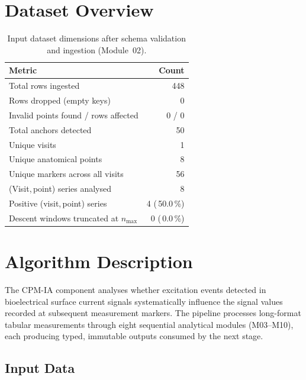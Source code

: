 \documentclass[a4paper,11pt]{article}
\begin{document}
\section{Dataset Overview}

\begin{table}[h!]
\centering
\small
\caption{Input dataset dimensions after schema validation and ingestion (Module~02).}
\begin{tabular}{lr}
\toprule
\textbf{Metric} & \textbf{Count} \\
\midrule
Total rows ingested                        & 448 \\
Rows dropped (empty keys)                  & 0 \\
Invalid points found / rows affected       & 0 / 0 \\
Total anchors detected                     & 50 \\
Unique visits                          & 1 \\
Unique anatomical points               & 8 \\
Unique markers across all visits       & 56 \\
(Visit,\,point) series analysed        & 8 \\
Positive (visit,\,point) series        & 4 (\,50.0\,\%) \\
Descent windows truncated at $n_{\max}$ & 0 (\,0.0\,\%) \\
\bottomrule
\end{tabular}
\end{table}

\section{Algorithm Description}

The CPM-IA component analyses whether excitation events detected in bioelectrical surface
current signals systematically influence the signal values recorded at subsequent measurement
markers. The pipeline processes long-format tabular measurements through eight sequential
analytical modules (M03--M10), each producing typed, immutable outputs consumed by the next
stage.

\subsection{Input Data}
\end{document}
